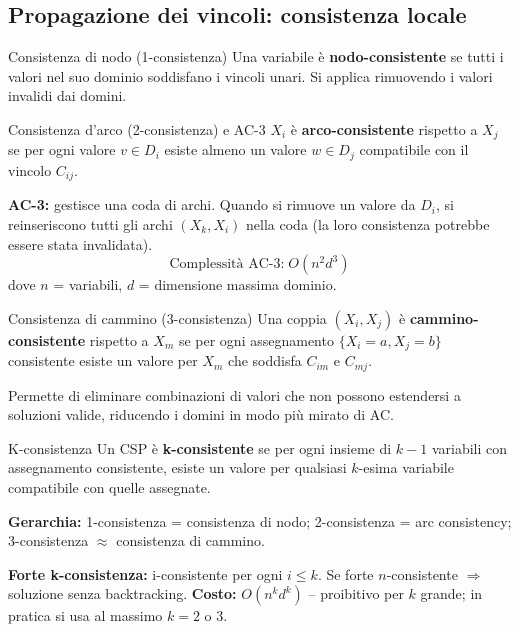 \documentclass[12pt,a4paper]{article}
\begin{document}
\subsection{Propagazione dei vincoli: consistenza locale}

\begin{defbox}{Consistenza di nodo (1-consistenza)}
Una variabile è \textbf{nodo-consistente} se tutti i valori nel suo dominio soddisfano i vincoli unari. Si applica rimuovendo i valori invalidi dai domini.
\end{defbox}

\begin{defbox}{Consistenza d'arco (2-consistenza) e AC-3}
$X_i$ è \textbf{arco-consistente} rispetto a $X_j$ se per ogni valore $v \in D_i$ esiste almeno un valore $w \in D_j$ compatibile con il vincolo $C_{ij}$.

\textbf{AC-3:} gestisce una coda di archi. Quando si rimuove un valore da $D_i$, si reinseriscono tutti gli archi $(X_k, X_i)$ nella coda (la loro consistenza potrebbe essere stata invalidata).
\[
\text{Complessità AC-3:} \; O(n^2 d^3)
\]
dove $n$ = variabili, $d$ = dimensione massima dominio.
\end{defbox}

\begin{defbox}{Consistenza di cammino (3-consistenza)}
Una coppia $(X_i, X_j)$ è \textbf{cammino-consistente} rispetto a $X_m$ se per ogni assegnamento $\{X_i = a, X_j = b\}$ consistente esiste un valore per $X_m$ che soddisfa $C_{im}$ e $C_{mj}$.

Permette di eliminare combinazioni di valori che non possono estendersi a soluzioni valide, riducendo i domini in modo più mirato di AC.
\end{defbox}

\begin{thmbox}{K-consistenza}
Un CSP è \textbf{k-consistente} se per ogni insieme di $k-1$ variabili con assegnamento consistente, esiste un valore per qualsiasi $k$-esima variabile compatibile con quelle assegnate.

\textbf{Gerarchia:} 1-consistenza = consistenza di nodo; 2-consistenza = arc consistency; 3-consistenza $\approx$ consistenza di cammino.

\textbf{Forte k-consistenza:} i-consistente per ogni $i \leq k$. Se forte $n$-consistente $\Rightarrow$ soluzione senza backtracking. \textbf{Costo:} $O(n^k d^k)$ -- proibitivo per $k$ grande; in pratica si usa al massimo $k = 2$ o $3$.
\end{thmbox}
\end{document}
